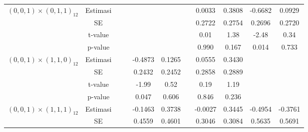 \begin{enumerate}[label=\alph*.]
\begin{longtable}{|c|c|c|c|c|c|c|c|c|c|c|}
            \multirow{4}{*}{$(0,0,1)\times(0,1,1)_{12}$}
            & Estimasi
            & {} & {}
            & {} & {} & {}
            & {0.0033} & {0.3808}
            & {-0.6682} & {0.0929} \\ \cline{2-11}

            & SE
            & {} & {}
            & {} & {} & {}
            & {0.2722} & {0.2754}
            & {0.2696} & {0.2720} \\ \cline{2-11}

            & t-value
            & {} & {}
            & {} & {} & {}
            & {0.01} & {1.38}
            & {-2.48} & {0.34} \\ \cline{2-11}

            & p-value
            & {} & {}
            & {} & {} & {}
            & {0.990} & {0.167}
            & {0.014} & {0.733} \\ \hline

            \multirow{4}{*}{$(0,0,1)\times(1,1,0)_{12}$}
            & Estimasi
            & {} & {}
            & {-0.4873} & {0.1265} & {}
            & {0.0555} & {0.3430}
            & {} & {} \\ \cline{2-11}

            & SE
            & {} & {}
            & {0.2432} & {0.2452} & {}
            & {0.2858} & {0.2889}
            & {} & {} \\ \cline{2-11}

            & t-value
            & {} & {}
            & {-1.99} & {0.52} & {}
            & {0.19} & {1.19}
            & {} & {} \\ \cline{2-11}

            & p-value
            & {} & {}
            & {0.047} & {0.606} & {}
            & {0.846} & {0.236}
            & {} & {} \\ \hline

            \multirow{4}{*}{$(0,0,1)\times(1,1,1)_{12}$}
            & Estimasi
            & {} & {}
            & {-0.1463} & {0.3738} & {}
            & {-0.0027} & {0.3445}
            & {-0.4954} & {-0.3761} \\ \cline{2-11}

            & SE
            & {} & {}
            & {0.4559} & {0.4601} & {}
            & {0.3046} & {0.3084}
            & {0.5635} & {0.5691} \\ \cline{2-11}


\end{longtable}
\end{enumerate}
